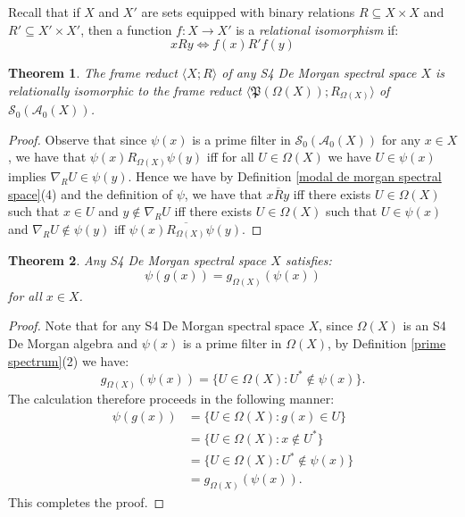 \documentclass{amsart}
\theoremstyle{plain}
\newtheorem{theorem}{Theorem}[section]
\theoremstyle{definition}
\begin{document}
 Recall that if $X$ and $X'$ are sets equipped with binary relations $R\subseteq X\times X$ and $R'\subseteq X'\times X'$, then a function $f\colon X\to X'$ is a \emph{relational isomorphism} if:  
\[xRy\Longleftrightarrow f(x)R'f(y)\]
\begin{theorem}\label{relaitonal iso}
    The frame reduct $\langle X;R\rangle$ of any S4 De Morgan spectral space $X$ is relationally isomorphic to the frame reduct $\langle\mathfrak{P}(\Omega(X));R_{\Omega(X)}\rangle$ of $\mathcal{S}_0(\mathcal{A}_0(X))$.  
\end{theorem}
\begin{proof}
Observe that since $\psi(x)$ is a prime filter in $\mathcal{S}_0(\mathcal{A}_0(X))$ for any $x\in X$, we have that $\psi(x)R_{\Omega(X)}\psi(y)$ iff for all $U\in\Omega(X)$ we have $U\in \psi(x)$ implies $\nabla_{R}U\in\psi(y)$. Hence we have by Definition \ref{modal de morgan spectral space}(4) and the definition of $\psi$, we have that $x\overline{R}y$ iff there exists $U\in\Omega(X)$ such that $x\in U$ and $y\not\in\nabla_RU$ iff there exists $U\in\Omega(X)$ such that $U\in\psi(x)$ and $\nabla_RU\not\in\psi(y)$ iff $\psi(x)\overline{R_{\Omega(X)}}\psi(y)$.   
\end{proof}
\begin{theorem}\label{theorem 3.16}
    Any S4 De Morgan spectral space $X$ satisfies: \[\psi(g(x))=g_{\Omega(X)}(\psi(x))\] for all $x\in X$.   
\end{theorem}
\begin{proof}
   Note that for any S4 De Morgan spectral space $X$, since $\Omega(X)$ is an S4 De Morgan algebra and $\psi(x)$ is a prime filter in $\Omega(X)$, by Definition \ref{prime spectrum}(2) we have: 
   \[g_{\Omega(X)}(\psi(x))=\{U\in\Omega(X):U^*\not\in \psi(x)\}.\]
   The calculation therefore proceeds in the following manner: 
    \begin{align*}
        \psi(g(x))&=\{U\in\Omega(X):g(x)\in U\}
        \\&=\{U\in\Omega(X):x\not\in U^*\}
        \\&=\{U\in\Omega(X):U^*\not\in \psi(x)\}
        \\&=g_{\Omega(X)}(\psi(x)).
    \end{align*}
This completes the proof.
\end{proof}
\end{document}
